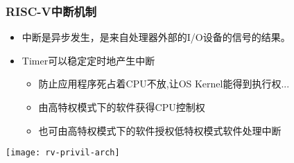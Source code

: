 
\begin{frame}
	\frametitle{RISC-V中断机制}
	\begin{itemize}
		\item 中断是异步发生，是来自处理器外部的I/O设备的信号的结果。
		
		
		\item Timer可以稳定定时地产生中断
		\begin{itemize}
			\item 防止应用程序死占着CPU不放,让OS Kernel能得到执行权...
			\item 由高特权模式下的软件获得CPU控制权
			\item 也可由高特权模式下的软件授权低特权模式软件处理中断
		\end{itemize}				
		
	\end{itemize}
	
	\centering
	\texttt{[image: rv-privil-arch]}
	
\end{frame}



